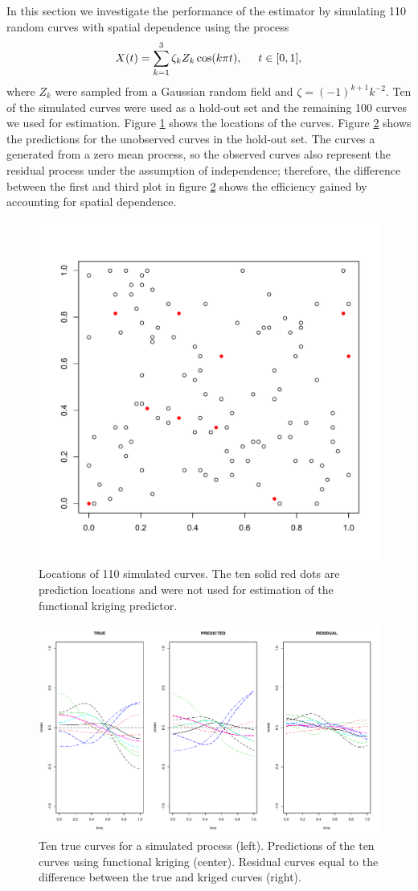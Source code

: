 \label{sec:numerical_experiments}

In this section we investigate the performance of the estimator by simulating 110 random curves with spatial dependence using the process 
\begin{equation}
	X(t) = \sum^{3}_{k=1}\zeta_k Z_k \cos(k\pi t), \hspace{0.5cm} t \in [0,1], 
	\label{eq:sim process2} 
\end{equation}
where $Z_k$ were sampled from a Gaussian random field and \(\zeta=(-1)^{k+1}k^{-2}\). Ten of the simulated curves were used as a hold-out set and the remaining 100 curves we used for estimation. Figure \ref{fig:locations} shows the locations of the curves. Figure \ref{fig:curve kriging predictions} shows the predictions for the unobserved curves in the hold-out set. The curves a generated from a zero mean process, so the observed curves also represent the residual process under the assumption of independence; therefore, the difference between the first and third plot in figure \ref{fig:curve kriging predictions} shows the efficiency gained by accounting for spatial dependence.
\begin{figure}
	\begin{center}
		\includegraphics[width=0.5
		\textwidth]{images/kriging/locations.pdf} 
	\end{center}
	\caption{Locations of 110 simulated curves. The ten solid red dots are prediction locations and were not used for estimation of the functional kriging predictor.} \label{fig:locations} 
\end{figure}
\begin{figure}
	\begin{center}
		\includegraphics[width=0.6
		\textwidth]{images/kriging/residual-curves.pdf} 
	\end{center}
	\caption{Ten true curves for a simulated process (left). Predictions of the ten curves using functional kriging (center). Residual curves equal to the difference between the true and kriged curves (right). } \label{fig:curve kriging predictions} 
\end{figure}

